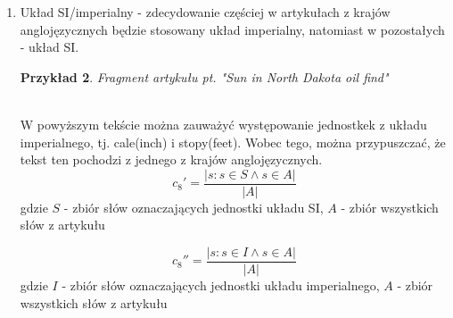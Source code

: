 \documentclass{classrep}
\newtheorem{exmp}{Przykład}[section]
\begin{document}
\begin{enumerate}
\begin{exmp}
{    not belong to its integrated military command.} \\
    \end{exmp}
    W powyższym fragmencie skrót NATO(Organizacja Traktatu Północnoatlantyckiego) występuje 2 razy. Według nas, częstość występowania skrótów, w danym artykule może mieć związek z tym, jakiego kraju dotyczy tekst.
    \begin{equation}
        c_7 = \frac{|{s: s \in W}|}{|A|}
    \end{equation}
    gdzie $W$ - zbiór słów, pisanych w artykule wielkimi literami, $A$ - zbiór wszystkich słów z artykułu
    \item Układ SI/imperialny - zdecydowanie częściej w artykułach z krajów anglojęzycznych będzie stosowany układ imperialny, natomiast w pozostałych - układ SI. \\
    \begin{exmp}Fragment artykułu pt. "Sun in North Dakota oil find" \cite{reuters} \\
     \\
    \end{exmp}
    W powyższym tekście można zauważyć występowanie jednostkek z układu imperialnego, tj. cale(inch) i stopy(feet). Wobec tego, można przypuszczać, że tekst ten pochodzi z jednego z krajów anglojęzycznych. 
     \begin{equation}
        c_8' = \frac{|{s: s \in S \land s \in A}|}{|A|}
    \end{equation}
    gdzie $S$ - zbiór słów oznaczających jednostki układu SI, $A$ - zbiór wszystkich słów z artykułu
    
    \begin{equation}
        c_8'' = \frac{|{s: s \in I \land s \in A}|}{|A|}
    \end{equation}
    gdzie $I$ - zbiór słów oznaczających jednostki układu imperialnego, $A$ - zbiór wszystkich słów z artykułu
    

\end{enumerate}
\end{document}
